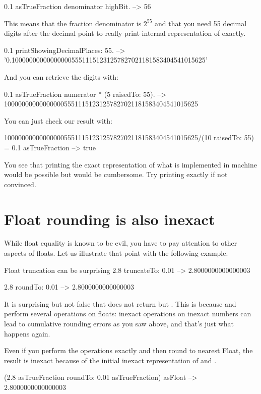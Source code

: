 \documentclass[a4paper,10pt,twoside]{book}
\begin{document}
\begin{code}{}
0.1 asTrueFraction denominator highBit.
	-->  56
\end{code}

This means that the fraction denominator is $2^{55}$ and that you need 55 decimal digits after the decimal point to really print internal representation of  exactly.
\begin{code}{}
0.1 printShowingDecimalPlaces: 55.
	--> '0.1000000000000000055511151231257827021181583404541015625'
\end{code}
And you can retrieve the digits with:
\begin{code}{}
0.1 asTrueFraction numerator * (5 raisedTo: 55).
	-->  1000000000000000055511151231257827021181583404541015625
\end{code}
You can just check our result with:
\begin{code}{}
1000000000000000055511151231257827021181583404541015625/(10 raisedTo: 55) =  0.1 asTrueFraction
	--> true
\end{code}
You see that printing the exact representation of what is implemented in machine would be possible but would be cumbersome. Try printing  exactly if not convinced.



\section{Float rounding is also inexact}
While float equality is known to be evil, you have to pay attention to other aspects of floats. Let us illustrate that point with the following example.

\begin{code}{Float truncation can be surprising}
2.8 truncateTo: 0.01
	--> 2.8000000000000003

2.8 roundTo: 0.01
	--> 2.8000000000000003
\end{code}

It is surprising but not false that  does not return  but . This is because  and  perform several operations on floats: inexact operations on inexact numbers can lead to cumulative rounding errors as you saw above, and that's just what happens again.

Even if you perform the operations exactly and then round to nearest Float, the result is inexact because of the initial inexact representation of   and  . 
\begin{code}{}
(2.8 asTrueFraction roundTo: 0.01 asTrueFraction) asFloat
	--> 2.8000000000000003
\end{code}
\end{document}
